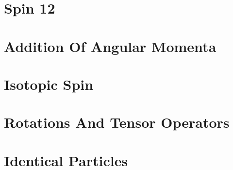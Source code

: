 \documentclass[11pt,twoside,openright]{book}
\begin{document}
\chapter{Spin 12}








\chapter{Addition Of Angular Momenta}






\chapter{Isotopic Spin}


\chapter{Rotations And Tensor Operators}






\chapter{Identical Particles}






\end{document}

